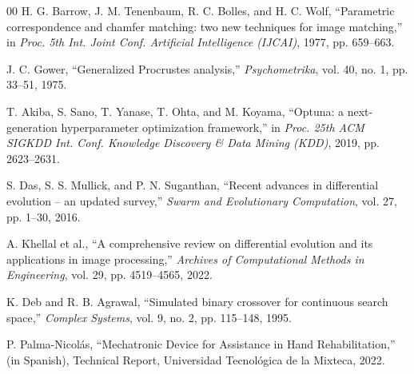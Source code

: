 \begin{thebibliography}{00}
 H. G. Barrow, J. M. Tenenbaum, R. C. Bolles, and H. C. Wolf,
``Parametric correspondence and chamfer matching: two new techniques for image matching,''
in \textit{Proc. 5th Int. Joint Conf. Artificial Intelligence (IJCAI)}, 1977, pp. 659--663.

 J. C. Gower,
``Generalized Procrustes analysis,''
\textit{Psychometrika}, vol. 40, no. 1, pp. 33--51, 1975.

 T. Akiba, S. Sano, T. Yanase, T. Ohta, and M. Koyama,
``Optuna: a next-generation hyperparameter optimization framework,'' in
\textit{Proc. 25th ACM SIGKDD Int. Conf. Knowledge Discovery \& Data Mining
(KDD)}, 2019, pp. 2623--2631.

 S. Das, S. S. Mullick, and P. N. Suganthan,
``Recent advances in differential evolution -- an updated survey,''
\textit{Swarm and Evolutionary Computation}, vol. 27, pp. 1--30, 2016.

 A. Khellal et al.,
``A comprehensive review on differential evolution and its applications in image
processing,'' \textit{Archives of Computational Methods in Engineering},
vol. 29, pp. 4519--4565, 2022.

 K. Deb and R. B. Agrawal,
``Simulated binary crossover for continuous search space,''
\textit{Complex Systems}, vol. 9, no. 2, pp. 115--148, 1995.

 P. Palma-Nicol\'as,
``Mechatronic Device for Assistance in Hand Rehabilitation,'' (in Spanish),
Technical Report, Universidad Tecnol\'ogica de la Mixteca, 2022.

\end{thebibliography}
